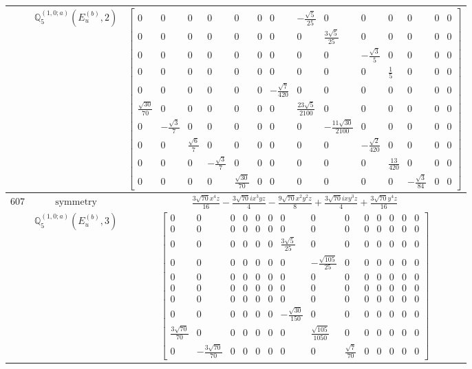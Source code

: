 \documentclass[fleqn,8pt,landscape]{jsarticle}
\begin{document}
\begin{longtable}{ccc}
$  $ & $ \mathbb{Q}_{5}^{(1,0;a)}(E_{u}^{(b)},2) $ & $ \begin{bmatrix} 0 & 0 & 0 & 0 & 0 & 0 & 0 & - \frac{\sqrt{5}}{25} & 0 & 0 & 0 & 0 & 0 & 0 \\ 0 & 0 & 0 & 0 & 0 & 0 & 0 & 0 & \frac{3 \sqrt{5}}{25} & 0 & 0 & 0 & 0 & 0 \\ 0 & 0 & 0 & 0 & 0 & 0 & 0 & 0 & 0 & - \frac{\sqrt{3}}{5} & 0 & 0 & 0 & 0 \\ 0 & 0 & 0 & 0 & 0 & 0 & 0 & 0 & 0 & 0 & \frac{1}{5} & 0 & 0 & 0 \\ 0 & 0 & 0 & 0 & 0 & 0 & - \frac{\sqrt{7}}{420} & 0 & 0 & 0 & 0 & 0 & 0 & 0 \\ \frac{\sqrt{30}}{70} & 0 & 0 & 0 & 0 & 0 & 0 & \frac{23 \sqrt{5}}{2100} & 0 & 0 & 0 & 0 & 0 & 0 \\ 0 & - \frac{\sqrt{3}}{7} & 0 & 0 & 0 & 0 & 0 & 0 & - \frac{11 \sqrt{30}}{2100} & 0 & 0 & 0 & 0 & 0 \\ 0 & 0 & \frac{\sqrt{6}}{7} & 0 & 0 & 0 & 0 & 0 & 0 & - \frac{\sqrt{2}}{420} & 0 & 0 & 0 & 0 \\ 0 & 0 & 0 & - \frac{\sqrt{3}}{7} & 0 & 0 & 0 & 0 & 0 & 0 & \frac{13}{420} & 0 & 0 & 0 \\ 0 & 0 & 0 & 0 & \frac{\sqrt{30}}{70} & 0 & 0 & 0 & 0 & 0 & 0 & - \frac{\sqrt{3}}{84} & 0 & 0 \end{bmatrix} $ \\ \hline
$ 607 $ & $ \text{symmetry} $ & $ \frac{3 \sqrt{70} x^{4} z}{16} - \frac{3 \sqrt{70} i x^{3} y z}{4} - \frac{9 \sqrt{70} x^{2} y^{2} z}{8} + \frac{3 \sqrt{70} i x y^{3} z}{4} + \frac{3 \sqrt{70} y^{4} z}{16} $ \\
$  $ & $ \mathbb{Q}_{5}^{(1,0;a)}(E_{u}^{(b)},3) $ & $ \begin{bmatrix} 0 & 0 & 0 & 0 & 0 & 0 & 0 & 0 & 0 & 0 & 0 & 0 & 0 & 0 \\ 0 & 0 & 0 & 0 & 0 & 0 & 0 & 0 & 0 & 0 & 0 & 0 & 0 & 0 \\ 0 & 0 & 0 & 0 & 0 & 0 & \frac{3 \sqrt{5}}{25} & 0 & 0 & 0 & 0 & 0 & 0 & 0 \\ 0 & 0 & 0 & 0 & 0 & 0 & 0 & - \frac{\sqrt{105}}{25} & 0 & 0 & 0 & 0 & 0 & 0 \\ 0 & 0 & 0 & 0 & 0 & 0 & 0 & 0 & 0 & 0 & 0 & 0 & 0 & 0 \\ 0 & 0 & 0 & 0 & 0 & 0 & 0 & 0 & 0 & 0 & 0 & 0 & 0 & 0 \\ 0 & 0 & 0 & 0 & 0 & 0 & 0 & 0 & 0 & 0 & 0 & 0 & 0 & 0 \\ 0 & 0 & 0 & 0 & 0 & 0 & - \frac{\sqrt{30}}{150} & 0 & 0 & 0 & 0 & 0 & 0 & 0 \\ \frac{3 \sqrt{70}}{70} & 0 & 0 & 0 & 0 & 0 & 0 & \frac{\sqrt{105}}{1050} & 0 & 0 & 0 & 0 & 0 & 0 \\ 0 & - \frac{3 \sqrt{70}}{70} & 0 & 0 & 0 & 0 & 0 & 0 & \frac{\sqrt{7}}{70} & 0 & 0 & 0 & 0 & 0 \end{bmatrix} $ \\ \hline

\end{longtable}
\end{document}

